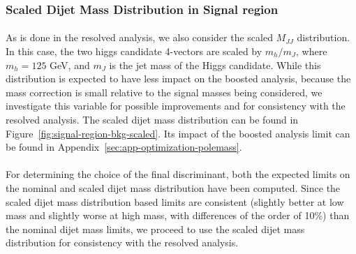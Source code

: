 
\clearpage
\subsubsection{Scaled Dijet Mass Distribution in Signal region}
\label{sec:boosted-SR-mjjscaled}

\paragraph{}
As is done in the resolved analysis, we also consider the scaled $M_{JJ}$ distribution.  In this case, the two higgs candidate 4-vectors are scaled by $m_{h} / m_{J}$, where $m_h = 125$ GeV, and $m_{J}$ is the \largeR jet mass of the Higgs candidate.  While this distribution is expected to have less impact on the boosted analysis, because the mass correction is small relative to the signal masses being considered, we investigate this variable for possible improvements and for consistency with the resolved analysis. The scaled dijet mass distribution can be found in Figure~\ref{fig:signal-region-bkg-scaled}. Its impact of the boosted analysis limit can be found in Appendix~\ref{sec:app-optimization-polemass}.

\paragraph{}
For determining the choice of the final discriminant, both the expected limits on the nominal and scaled dijet mass distribution have been computed.  Since the scaled dijet  mass distribution based limits are consistent (slightly better at low mass and slightly worse at high mass, with differences of the order of 10\%) than the nominal dijet mass limits, we  proceed to use the scaled dijet mass distribution for consistency with the resolved analysis.

